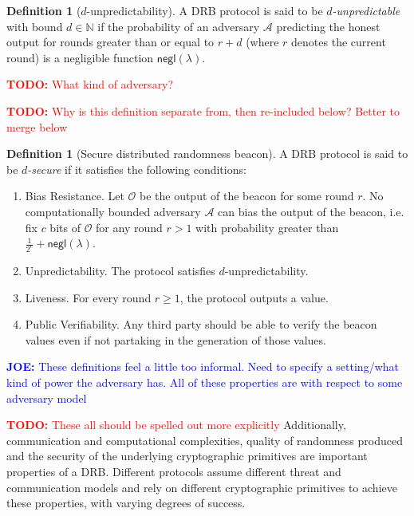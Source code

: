 \documentclass[letterpaper,twocolumn,10pt]{article}
\theoremstyle{definition}
\newtheorem{definition}[theorem]{Definition}
\theoremstyle{remark}
\newcommand{\todo}[1]{\textcolor{red}{\textbf{TODO:} #1}}
\newcommand{\joenote}[1]{\textcolor{blue}{\textbf{JOE:} #1}}
\begin{document}
\begin{definition}[$d$-unpredictability]
A DRB protocol is said to be \textit{$d$-unpredictable} with bound $d \in \mathbb{N}$ if the probability of an adversary $\mathcal{A}$ predicting the honest output for rounds greater than or equal to $r + d$ (where $r$ denotes the current round) is a negligible function $\mathsf{negl}(\lambda)$.
\end{definition}
\todo{What kind of adversary?}

\todo{Why is this definition separate from, then re-included below? Better to merge below}

\begin{definition}[Secure distributed randomness beacon]
A DRB protocol is said to be \textit{$d$-secure} if it satisfies the following conditions:
\begin{enumerate}
\item Bias Resistance. Let $\mathcal{O}$ be the output of the beacon for some round $r$. No computationally bounded adversary $\mathcal{A}$ can bias the output of the beacon, i.e. fix $c$ bits of $\mathcal{O}$ for any round $r > 1$ with probability greater than $\frac{1}{2^c} + \mathsf{negl}(\lambda)$.
\item Unpredictability. The protocol satisfies $d$-unpredictability.
\item Liveness. For every round $r \geq 1$, the protocol outputs a value.
\item Public Verifiability. Any third party should be able to verify the beacon values even if not partaking in the generation of those values.
\end{enumerate}
\end{definition}
\joenote{These definitions feel a little too informal. Need to specify a setting/what kind of power the adversary has. All of these properties are with respect to some adversary model}

\todo{These all should be spelled out more explicitly}
Additionally, communication and computational complexities, quality of randomness produced and the security of the underlying cryptographic primitives are important properties of a DRB. Different protocols assume different threat and communication models and rely on different cryptographic primitives to achieve these properties, with varying degrees of success. 
\end{document}
